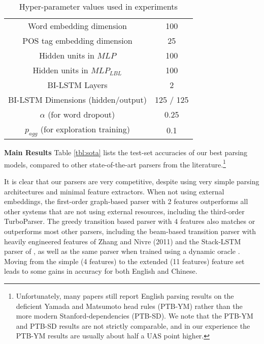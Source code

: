 \documentclass[11pt]{article}
\begin{document}
\begin{table}[ht]
\begin{center}
\begin{scalebox}{0.8}{
\begin{tabular}{ | c | c | }
\hline 
Word embedding dimension & 100 \\
POS tag embedding dimension & 25 \\
Hidden units in $MLP$ & 100 \\
Hidden units in $MLP_{LBL}$ & 100 \\
BI-LSTM Layers & 2 \\
BI-LSTM Dimensions (hidden/output)  & 125 / 125 \\
$\alpha$ (for word dropout) & 0.25 \\
$p_{agg}$ (for exploration training) & 0.1 \\
\hline
\end{tabular}}
\end{scalebox}
\caption{Hyper-parameter values used in experiments}
\label{tbl:hyper}
\end{center}
\end{table}

\noindent\textbf{Main Results}
Table \ref{tbl:sota} lists the test-set accuracies of our best parsing models, compared
to other state-of-the-art parsers from the literature.\footnote{Unfortunately, many
papers still report English parsing results on the deficient Yamada and
Matsumoto head rules (PTB-YM) rather than the more modern Stanford-dependencies
(PTB-SD). We note that the PTB-YM and PTB-SD results are not strictly
comparable, and in our experience the PTB-YM results are usually about half a
UAS point higher.}

It is clear that our parsers are very competitive, despite using very simple
parsing architectures and minimal feature extractors.  
When not
using external embeddings, the first-order graph-based parser with 2 features outperforms
all other systems that are not using
external resources, including the third-order TurboParser. The greedy transition
based parser with 4 features also matches or outperforms most other parsers,
including the beam-based transition parser with heavily engineered features of Zhang and
Nivre (2011) and the Stack-LSTM parser of , as well as the same parser when trained using a dynamic oracle \cite{ballesteros2016dynamic}.
Moving from the simple (4 features) to the extended (11 features) feature set
leads to some gains in accuracy for both English and Chinese.
\end{document}
